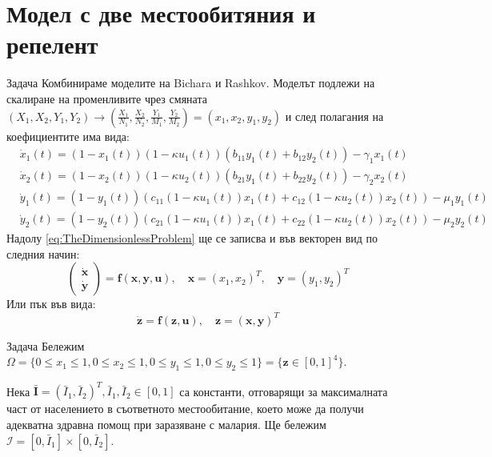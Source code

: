 \section{Модел с две местообитяния и репелент}
\begin{frame}[t]{Задача}
  Комбинираме моделите на Bichara и Rashkov.
  Моделът подлежи на скалиране на променливите чрез смяната $(X_1, X_2, Y_1, Y_2) \rightarrow (\frac{X_1}{N_1}, \frac{X_2}{N_2}, \frac{Y_1}{M_1}, \frac{Y_2}{M_2}) = (x_1, x_2, y_1, y_2)$ и след полагания на коефициентите има вида:
  \begin{equation}
    \label{eq:TheDimensionlessProblem}
    \begin{split}
      &\dot{x}_1(t) = (1-x_1(t)) (1-\kappa u_1(t)) \left(b_{11} y_1(t) + b_{12} y_2(t)\right) - \gamma_1 x_1(t) \\
      &\dot{x}_2(t) = (1-x_2(t)) (1-\kappa u_2(t))\left(b_{21} y_1(t) + b_{22} y_2(t)\right) - \gamma_2 x_2(t) \\
      &\dot{y}_1(t) = (1-y_1(t)) \left(c_{11}(1-\kappa u_1(t)) x_1(t) + c_{12}(1-\kappa u_2(t)) x_2(t)\right) - \mu_1 y_1(t) \\
      &\dot{y}_2(t) = (1-y_2(t)) \left(c_{21}(1-\kappa u_1(t)) x_1(t) + c_{22} (1-\kappa u_2(t)) x_2(t)\right) - \mu_2 y_2(t)
    \end{split}
  \end{equation}
  Надолу \ref{eq:TheDimensionlessProblem} ще се записва и във векторен вид по следния начин:
  \begin{equation}
    \begin{pmatrix}
      \dot{\boldsymbol{x}} \\
      \dot{\boldsymbol{y}}
    \end{pmatrix}
    =
    \boldsymbol{f}(\boldsymbol{x}, \boldsymbol{y}, \boldsymbol{u}), \quad
    \boldsymbol{x} = (x_1, x_2)^T, \quad \boldsymbol{y} = (y_1, y_2)^T
  \end{equation}
  Или пък във вида:
  \begin{equation}
    \dot{\boldsymbol{z}} = \boldsymbol{f}(\boldsymbol{z}, \boldsymbol{u}), \quad \boldsymbol{z} = (\boldsymbol{x}, \boldsymbol{y})^T
  \end{equation}
\end{frame}

\begin{frame}{Задача}
  Бележим $\Omega = \{0 \leq x_1 \leq 1, 0 \leq x_2 \leq 1, 0 \leq y_1 \leq 1, 0 \leq y_2 \leq 1\} = \{\boldsymbol{z} \in [0, 1]^4\}$.

  Нека $\bar{\boldsymbol{I}} = (\bar{I}_1, \bar{I}_2)^T, \bar{I}_1, \bar{I}_2 \in [0, 1]$ са константи, отговарящи за максималната част от населението в съответното местообитание, което може да получи адекватна здравна помощ при заразяване с малария. Ще бележим $\mathscr{I} = [0, \bar{I}_1] \times [0, \bar{I}_2]$.
\end{frame}

